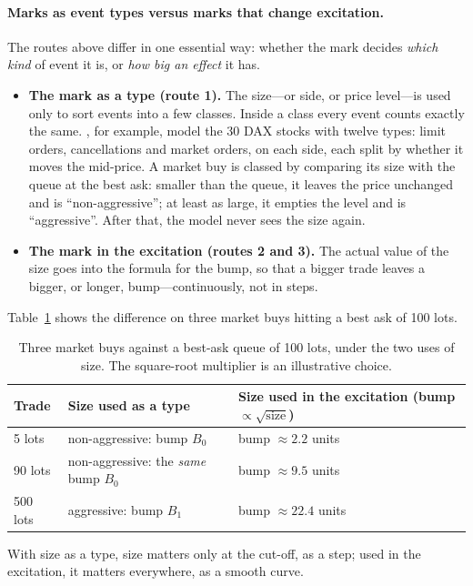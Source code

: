 \paragraph{Marks as event types versus marks that change excitation.} The routes above differ in one essential way: whether the
mark decides \emph{which kind} of event it is, or \emph{how big an effect} it has.
\begin{itemize}[leftmargin=1.5em,itemsep=2pt]
\item \textbf{The mark as a type (route 1).} The size---or side, or price level---is used only to sort events into a
  few classes. Inside a class every event counts exactly the same. \citet{lu2018}, for example, model the 30 DAX
  stocks with twelve types: limit orders, cancellations and market orders, on each side, each split by whether it
  moves the mid-price. A market buy is classed by comparing its size with the queue at the best ask: smaller than
  the queue, it leaves the price unchanged and is ``non-aggressive''; at least as large, it empties the level and
  is ``aggressive''. After that, the model never sees the size again.
\item \textbf{The mark in the excitation (routes 2 and 3).} The actual value of the size goes into the formula for
  the bump, so that a bigger trade leaves a bigger, or longer, bump---continuously, not in steps.
\end{itemize}
Table~\ref{tab:marks-example} shows the difference on three market buys hitting a best ask of 100 lots.

\begin{table}[!htbp]
\centering\footnotesize
\caption{Three market buys against a best-ask queue of 100 lots, under the two uses of size. The square-root
multiplier is an illustrative choice.}
\label{tab:marks-example}
\begin{tabular}{lll}
\toprule
Trade & Size used as a type & Size used in the excitation (bump $\propto \sqrt{\text{size}}$) \\
\midrule
5 lots & non-aggressive: bump $B_0$ & bump $\approx 2.2$ units \\
90 lots & non-aggressive: the \emph{same} bump $B_0$ & bump $\approx 9.5$ units \\
500 lots & aggressive: bump $B_1$ & bump $\approx 22.4$ units \\
\bottomrule
\end{tabular}
\end{table}

With size as a type, size matters only at the cut-off, as a step; used in the excitation, it matters everywhere,
as a smooth curve.

